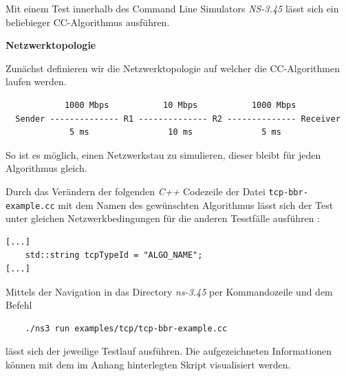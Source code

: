 \documentclass[paper=a4,fontsize=12pt,ngerman]{scrartcl}
\begin{document}
Mit einem Test innerhalb des Command Line Simulators \textit{NS-3.45}\cite{ns3-simu} lässt sich ein beliebieger CC-Algorithmus ausführen.


\textbf{Netzwerktopologie}

Zunächst definieren wir die Netzwerktopologie auf welcher die CC-Algorithmen
laufen werden.\cite{ns3BBR}
\small
\begin{verbatim}
            1000 Mbps           10 Mbps           1000 Mbps
  Sender -------------- R1 -------------- R2 -------------- Receiver
             5 ms                10 ms              5 ms
\end{verbatim}
So ist es möglich, einen Netzwerkstau zu simulieren, dieser bleibt für jeden Algorithmus gleich.

Durch das Verändern der folgenden \textit{C++} Codezeile der Datei \verb|tcp-bbr-example.cc| mit dem Namen des gewünschten Algorithmus lässt sich der Test unter gleichen Netzwerkbedingungen für die anderen Tesstfälle ausführen :

\small
\begin{verbatim}
[...]
    std::string tcpTypeId = "ALGO_NAME";     
[...]
\end{verbatim}
Mittels der Navigation in das Directory \textit{ns-3.45} per Kommandozeile und dem Befehl
\small
\begin{verbatim}
    ./ns3 run examples/tcp/tcp-bbr-example.cc
\end{verbatim}
lässt sich der jeweilige Testlauf ausführen.
 Die aufgezeichneten Informationen können mit dem im Anhang hinterlegten Skript visualisiert werden.
\end{document}
